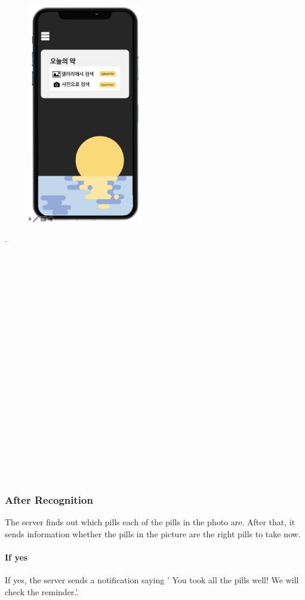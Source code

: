 \documentclass[conference]{IEEEtran}
\begin{document}
\begin{figure}[h!]
\centering
\includegraphics[width=5cm]{final_image_folder/today.png}
\caption{}
\label{fig:map}
\end{figure}
.\\
\\
\\
\\
\\
\\
\\
\\
\\
\\
\\
\\
\\
\\
\\
\\
\\
\\
\\
\\
\\

\subsubsection{After Recognition}
The server finds out which pills each of the pills in the photo are. After that, it sends information whether the pills in the picture are the right pills to take now. \\ 

\paragraph{If yes} If yes, the server sends a notification saying '
You took all the pills well! We will check the reminder.'. \\
\end{document}
